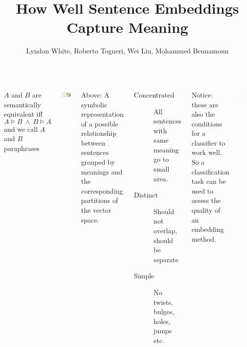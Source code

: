 \documentclass[a0paper, landscape]{tikzposter}
\title{How Well Sentence Embeddings Capture Meaning}
\author{Lyndon White, Roberto Togneri, Wei Liu, Mohammed Bennamoun}
\institute{The University of Western Australia}
\date{}
\begin{document}
\maketitle

\begin{columns}
    
    {
		{
 			$A$ and $B$ are semantically equivalent iff $$A\models B\:\wedge\:B\models A$$
 			and we call $A$ and $B$ paraphrases
 		}
 		\vspace{1.5ex}
		\begin{tikzfigure}
			\includegraphics[scale=2]{equiv}							
		\end{tikzfigure}
		{\small Above: A symbolic representation of a possible relationship between sentences grouped by meanings and the corresponding partitions of the vector space.}
		
		\vspace{2ex}
       	{
       		\begin{description}%
       			\item[Concentrated]\quad All sentences with same meaning go to small area.
       			\item[Distinct]\quad Should not overlap, should be separate      			
       			\item[Simple]\quad No twists, bulges, holes, jumps etc.      			
       		\end{description}
       		
			Notice: these are also the conditions for a classifier to work well.\\
			So a classification task can be used to assess the quality of an embedding method.
       	}
       	\vspace{2ex}
 	    {	
   	 		\begin{tikzfigure}
		     	\includegraphics[width=0.29\textwidth]{block_overview_poster}
   	 		\end{tikzfigure}
 	    }
 	}


\end{columns}
\end{document}
